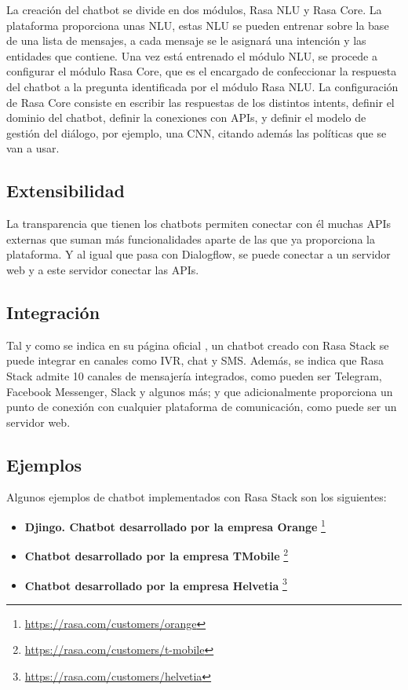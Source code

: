La creación del chatbot se divide en dos módulos, Rasa NLU y Rasa Core. La plataforma proporciona unas \gls{NLU}, estas \gls{NLU} se pueden entrenar sobre la base de una lista de mensajes, a cada mensaje se le asignará una intención y las entidades que contiene. Una vez está entrenado el módulo \gls{NLU}, se procede a configurar el módulo Rasa Core, que es el encargado de confeccionar la respuesta del chatbot a la pregunta identificada por el módulo Rasa NLU. La configuración de Rasa Core consiste en escribir las respuestas de los distintos intents, definir el dominio del chatbot, definir la conexiones con \glspl{API}, y definir el modelo de gestión del diálogo, por ejemplo, una \gls{CNN}, citando además las políticas que se van a usar.

\subsection*{Extensibilidad}

La transparencia que tienen los chatbots permiten conectar con él muchas \glspl{API} externas que suman más funcionalidades aparte de las que ya proporciona la plataforma. Y al igual que pasa con Dialogflow, se puede conectar a un servidor web y a este servidor conectar las \glspl{API}.

\subsection*{Integración}

Tal y como se indica en su página oficial \cite{RefWorks:RefID:20-2020rasa}, un chatbot creado con Rasa Stack se puede integrar en canales como IVR, chat y SMS. Además, se indica que Rasa Stack admite 10 canales de mensajería integrados, como pueden ser Telegram, Facebook Messenger, Slack y algunos más; y que adicionalmente proporciona un punto de conexión con cualquier plataforma de comunicación, como puede ser un servidor web.

\subsection*{Ejemplos}

Algunos ejemplos de chatbot implementados con Rasa Stack son los siguientes:

\begin{itemize}
\item \textbf{Djingo. Chatbot desarrollado por la empresa Orange} \footnote{\url{https://rasa.com/customers/orange}}
\item \textbf{Chatbot desarrollado por la empresa TMobile} \footnote{\url{https://rasa.com/customers/t-mobile}}
\item \textbf{Chatbot desarrollado por la empresa Helvetia} \footnote{\url{https://rasa.com/customers/helvetia}}
\end{itemize}


